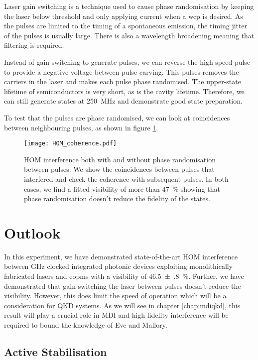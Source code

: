 Laser gain switching is a technique used to cause phase randomisation by keeping the laser below threshold and only applying current when a \ac{wcp} is desired. As the pulses are limited to the timing of a spontaneous emission, the timing jitter of the pulses is usually large. There is also a wavelength broadening meaning that filtering is required. 

Instead of gain switching to generate pulses, we can reverse the high speed pulse to provide a negative voltage between pulse carving. This pulses removes the carriers in the laser and makes each pulse phase randomised. The upper-state lifetime of semiconductors is very short, as is the cavity lifetime. Therefore, we can still generate states at \SI{250}{MHz} and demonstrate good state preparation.

To test that the pulses are phase randomised, we can look at coincidences between neighbouring pulses, as shown in figure \ref{fig:HOM_coherence}.  

\begin{figure}[tbp]
	\centering
	\texttt{[image: HOM\_coherence.pdf]}
	\caption[HOM interference with and without phase randomisation]{\ac{HOM} interference both with and without phase randomisation between pulses. We show the coincidences between pulses that interfered and check the coherence with subsequent pulses. In both cases, we find a fitted visibility of more than \SI{47}{\%} showing that phase randomisation doesn't reduce the fidelity of the states.}
	\label{fig:HOM_coherence}
\end{figure}

\section{Outlook}

In this experiment, we have demonstrated state-of-the-art \acl{HOM} interference between GHz clocked integrated photonic devices exploiting monolithically fabricated lasers and \acp{eopm} with a visibility of \SI{46.5(8)}{\%}. Further, we have demonstrated that gain switching the laser between pulses doesn't reduce the visibility. However, this does limit the speed of operation which will be a consideration for \ac{QKD} systems. As we will see in chapter \ref{chap:mdiqkd}, this result will play a crucial role in \ac{MDI} and high fidelity interference will be required to bound the knowledge of Eve and Mallory.

\subsection{Active Stabilisation}

